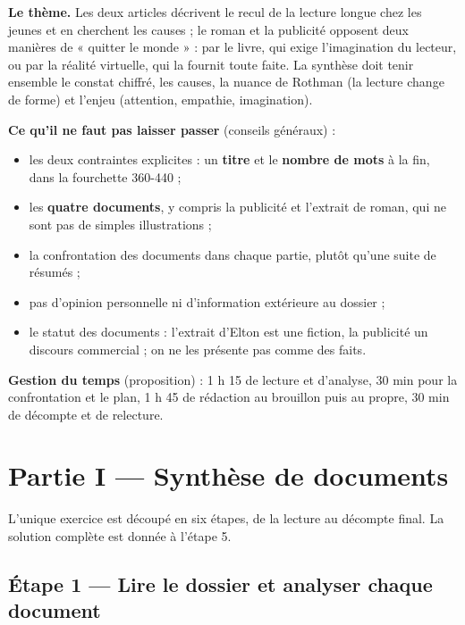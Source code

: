 \documentclass[11pt,a4paper]{article}
\providecommand{\tightlist}{\setlength{\itemsep}{0pt}\setlength{\parskip}{0pt}}
\begin{document}
\textbf{Le thème.} Les deux articles décrivent le recul de la lecture longue chez les jeunes et en cherchent les causes ; le roman et la publicité opposent deux manières de « quitter le monde » : par le livre, qui exige l'imagination du lecteur, ou par la réalité virtuelle, qui la fournit toute faite. La synthèse doit tenir ensemble le constat chiffré, les causes, la nuance de Rothman (la lecture change de forme) et l'enjeu (attention, empathie, imagination).

\textbf{Ce qu'il ne faut pas laisser passer} (conseils généraux) :

\begin{itemize}
\tightlist
\item
  les deux contraintes explicites : un \textbf{titre} et le \textbf{nombre de mots} à la fin, dans la fourchette 360-440 ;
\item
  les \textbf{quatre documents}, y compris la publicité et l'extrait de roman, qui ne sont pas de simples illustrations ;
\item
  la confrontation des documents dans chaque partie, plutôt qu'une suite de résumés ;
\item
  pas d'opinion personnelle ni d'information extérieure au dossier ;
\item
  le statut des documents : l'extrait d'Elton est une fiction, la publicité un discours commercial ; on ne les présente pas comme des faits.
\end{itemize}

\textbf{Gestion du temps} (proposition) : 1 h 15 de lecture et d'analyse, 30 min pour la confrontation et le plan, 1 h 45 de rédaction au brouillon puis au propre, 30 min de décompte et de relecture.

\hypertarget{partie-i-synthuxe8se-de-documents}{%
\section{Partie I --- Synthèse de documents}\label{partie-i-synthuxe8se-de-documents}}

L'unique exercice est découpé en six étapes, de la lecture au décompte final. La solution complète est donnée à l'étape 5.

\hypertarget{uxe9tape-1-lire-le-dossier-et-analyser-chaque-document}{%
\subsection{Étape 1 --- Lire le dossier et analyser chaque document}\label{uxe9tape-1-lire-le-dossier-et-analyser-chaque-document}}
\end{document}
